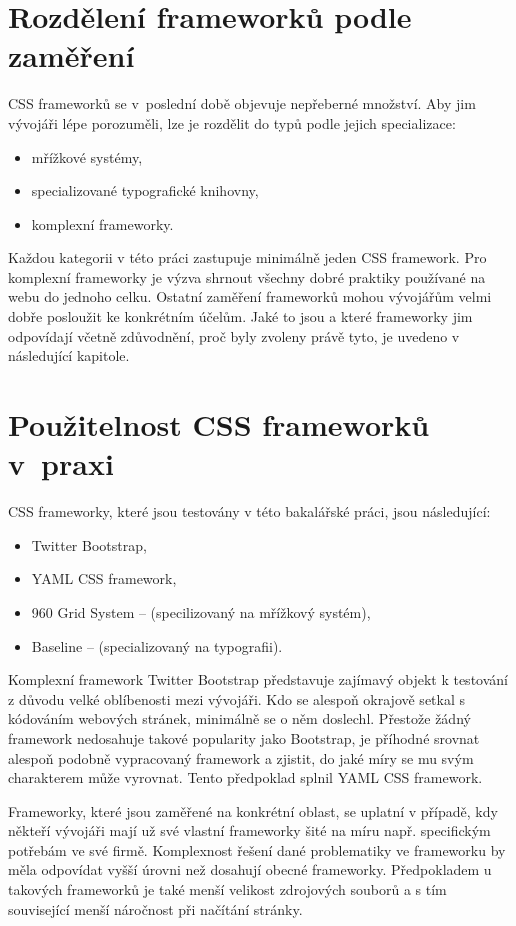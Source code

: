 \documentclass[thesis=B,czech]{FITthesis}[2012/06/26]
\begin{document}
\section{Rozdělení frameworků podle zaměření}

CSS frameworků se v~poslední době objevuje nepřeberné množství. Aby jim vývojáři lépe porozuměli, lze je rozdělit do typů podle jejich specializace:

\begin{itemize}
 \item mřížkové systémy,
 \item specializované typografické knihovny,
 \item komplexní frameworky.
\end{itemize}
Každou kategorii v této práci zastupuje minimálně jeden CSS framework. Pro komplexní frameworky je výzva shrnout všechny dobré praktiky používané na webu do jednoho celku. Ostatní zaměření frameworků mohou vývojářům velmi dobře posloužit ke konkrétním účelům. Jaké to jsou a které frameworky jim odpovídají včetně zdůvodnění, proč byly zvoleny právě tyto, je uvedeno v následující kapitole.


\section{Použitelnost CSS frameworků v~praxi}

CSS frameworky, které jsou testovány v této bakalářské práci, jsou následující:

\begin{itemize}
 \item Twitter Bootstrap,
 \item YAML CSS framework,
 \item 960 Grid System -- (specilizovaný na mřížkový systém),
 \item Baseline -- (specializovaný na typografii).
\end{itemize}
Komplexní framework Twitter Bootstrap představuje zajímavý objekt k testování z důvodu velké oblíbenosti mezi vývojáři. Kdo se alespoň okrajově setkal s kódováním webových stránek, minimálně se o něm doslechl. Přestože žádný framework nedosahuje takové popularity jako Bootstrap, je příhodné srovnat alespoň podobně vypracovaný framework a zjistit, do jaké míry se mu svým charakterem může vyrovnat. Tento předpoklad splnil YAML CSS framework.

Frameworky, které jsou zaměřené na konkrétní oblast, se uplatní v případě, kdy někteří vývojáři mají už své vlastní frameworky šité na míru např. specifickým potřebám ve své firmě. Komplexnost řešení dané problematiky ve frameworku by měla odpovídat vyšší úrovni než dosahují obecné frameworky. Předpokladem u takových frameworků je také menší velikost zdrojových souborů a s tím související menší náročnost při načítání stránky.  
\end{document}
